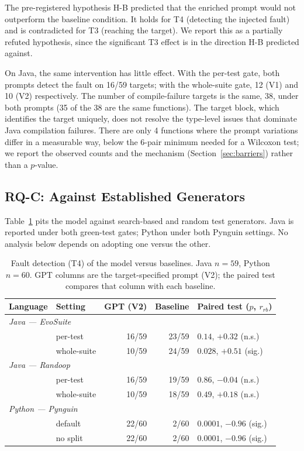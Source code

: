 The pre-registered hypothesis H-B predicted that the enriched prompt would not outperform the
baseline condition. It holds for T4 (detecting the injected fault) and is contradicted for T3
(reaching the target). We report this as a partially refuted hypothesis, since the significant
T3 effect is in the direction H-B predicted against.

On Java, the same intervention has little effect. With the per-test gate, both prompts detect
the fault on 16/59 targets; with the whole-suite gate, 12 (V1) and 10 (V2) respectively. The
number of compile-failure targets is the same, 38, under both prompts (35 of the 38 are the
same functions). The target block, which identifies the target uniquely, does not resolve the
type-level issues that dominate Java compilation failures. There are only 4 functions where
the prompt variations differ in a measurable way, below the 6-pair minimum needed for a
Wilcoxon test; we report the observed counts and the mechanism (Section~\ref{sec:barriers})
rather than a $p$-value.

\subsection{RQ-C: Against Established Generators}\label{sec:rqc}

Table~\ref{tab:rqc} pits the model against search-based and random test generators. Java is
reported under both green-test gates; Python under both Pynguin settings. No analysis below
depends on adopting one versus the other.

\begin{table}[t]
\centering
\caption{Fault detection (T4) of the model versus baselines. Java $n = 59$, Python $n = 60$.
GPT columns are the target-specified prompt (V2); the paired test compares that column with
each baseline.}
\label{tab:rqc}
\begin{tabular}{llrrl}
\toprule
Language & Setting & GPT (V2) & Baseline & Paired test ($p$, $r_{rb}$) \\
\midrule
\multicolumn{5}{l}{\emph{Java --- EvoSuite}} \\
 & per-test    & 16/59 & 23/59 & $0.14$, $+0.32$ (n.s.) \\
 & whole-suite & 10/59 & 24/59 & $0.028$, $+0.51$ (sig.) \\
\multicolumn{5}{l}{\emph{Java --- Randoop}} \\
 & per-test    & 16/59 & 19/59 & $0.86$, $-0.04$ (n.s.) \\
 & whole-suite & 10/59 & 18/59 & $0.49$, $+0.18$ (n.s.) \\
\multicolumn{5}{l}{\emph{Python --- Pynguin}} \\
 & default     & 22/60 & 2/60 & $0.0001$, $-0.96$ (sig.) \\
 & no split    & 22/60 & 2/60 & $0.0001$, $-0.96$ (sig.) \\
\bottomrule
\end{tabular}
\end{table}

